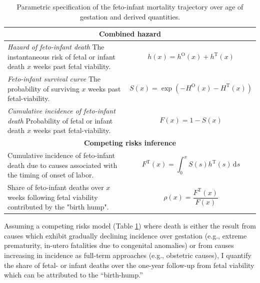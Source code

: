 \documentclass[10pt, twoside]{article}
\begin{document}
\begin{table}
\begin{tabular}{p{5.9cm}p{5.9cm}}
\multicolumn{2}{c}{\textbf{Combined hazard}} \\ \midrule

\textit{Hazard of feto-infant death}
The instantaneous risk of fetal or infant death $x$ weeks past fetal viability.

&

$$
h(x) = h^\mathrm{O}(x) + h^\mathrm{T}(x)
$$

\\

\textit{Feto-infant survival curve} The probability of surviving $x$ weeks past fetal-viability.

&

$$
S(x) = \exp\left(-H^\mathrm{O}(x)-H^\mathrm{T}(x)\right)
$$

\\

\textit{Cumulative incidence of feto-infant death} Probability of fetal or infant death $x$ weeks past fetal-viability.

&

$$
F(x) = 1-S(x)
$$

\\ \midrule

\multicolumn{2}{c}{\textbf{Competing risks inference}} \\ \midrule

Cumulative incidence of feto-infant death due to causes associated with the timing of onset of labor.

&

$$
F^\mathrm{T}(x) = \int_0^x S(s)h^\mathrm{T}(s)\,\mathrm{d}s
$$

\\

Share of feto-infant deaths over $x$ weeks following fetal viability contributed by the "birth hump".

&

$$
\rho(x) = \frac {F^\mathrm{T}(x)} {F(x)}
$$

\\ \bottomrule

\end{tabular}
\caption{\label{tab:hazard-model} Parametric specification of the feto-infant mortality trajectory over age of gestation and derived quantities.}
\end{table}

\clearpage

Assuming a competing risks model (Table \ref{tab:hazard-model}) where death is either the result from causes which exhibit gradually declining incidence over gestation (e.g., extreme prematurity, in-utero fatalities due to congenital anomalies) or from causes increasing in incidence as full-term approaches (e.g., obstetric causes), I quantify the share of fetal- or infant deaths over the one-year follow-up from fetal viability which can be attributed to the ``birth-hump.''
\end{document}
